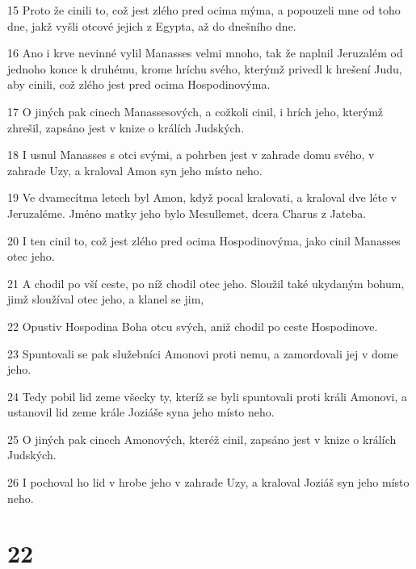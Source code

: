 \par 15 Proto že cinili to, což jest zlého pred ocima mýma, a popouzeli mne od toho dne, jakž vyšli otcové jejich z Egypta, až do dnešního dne.
\par 16 Ano i krve nevinné vylil Manasses velmi mnoho, tak že naplnil Jeruzalém od jednoho konce k druhému, krome hríchu svého, kterýmž privedl k hrešení Judu, aby cinili, což zlého jest pred ocima Hospodinovýma.
\par 17 O jiných pak cinech Manassesových, a cožkoli cinil, i hrích jeho, kterýmž zhrešil, zapsáno jest v knize o králích Judských.
\par 18 I usnul Manasses s otci svými, a pohrben jest v zahrade domu svého, v zahrade Uzy, a kraloval Amon syn jeho místo neho.
\par 19 Ve dvamecítma letech byl Amon, když pocal kralovati, a kraloval dve léte v Jeruzaléme. Jméno matky jeho bylo Mesullemet, dcera Charus z Jateba.
\par 20 I ten cinil to, což jest zlého pred ocima Hospodinovýma, jako cinil Manasses otec jeho.
\par 21 A chodil po vší ceste, po níž chodil otec jeho. Sloužil také ukydaným bohum, jimž sloužíval otec jeho, a klanel se jim,
\par 22 Opustiv Hospodina Boha otcu svých, aniž chodil po ceste Hospodinove.
\par 23 Spuntovali se pak služebníci Amonovi proti nemu, a zamordovali jej v dome jeho.
\par 24 Tedy pobil lid zeme všecky ty, kteríž se byli spuntovali proti králi Amonovi, a ustanovil lid zeme krále Joziáše syna jeho místo neho.
\par 25 O jiných pak cinech Amonových, kteréž cinil, zapsáno jest v knize o králích Judských.
\par 26 I pochoval ho lid v hrobe jeho v zahrade Uzy, a kraloval Joziáš syn jeho místo neho.

\chapter{22}

